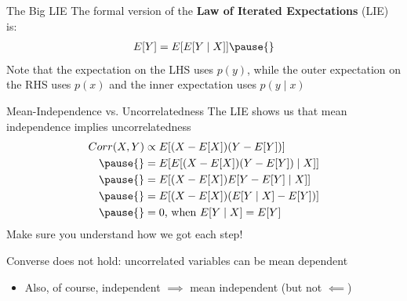 \documentclass[11pt,english,handout]{beamer}
\begin{document}
\begin{frame}{The Big LIE}
	The formal version of the \textbf{Law of Iterated Expectations} (LIE) is:
	\begin{align*}
		E[Y]=E[E[Y\mid X]]\pause{}
	\end{align*}
	Note that the expectation on the LHS uses $p(y)$, while the outer expectation on the RHS uses $p(x)$ and the inner expectation uses $p(y\mid x)$
	
\end{frame}



\begin{frame}{Mean-Independence vs. Uncorrelatedness}
\vspace{0.2cm}
The LIE shows us that mean independence implies uncorrelatedness
\begin{align*}
Corr(X,Y)&\propto E[(X-E[X])(Y-E[Y])]\\ \pause{}
&=E[E[(X-E[X])(Y-E[Y])\mid X]]\\ \pause{}
&= E[(X-E[X])E[Y-E[Y]\mid X]]\\\pause{}
&= E[(X-E[X])(E[Y\mid X]-E[Y])]\\\pause{}
&= 0\text{, when $E[Y\mid X]=E[Y]$}
\end{align*}
\pause{}
\vspace{0.3cm}
Make sure you understand how we got each step! 
\vspace{0.5cm}
\pause{}

Converse does not hold: uncorrelated variables can be mean dependent
\pause{}

\begin{itemize}
\item Also, of course, independent $\implies$ mean independent (but not $\impliedby$)
\end{itemize}

\end{frame}
\end{document}
